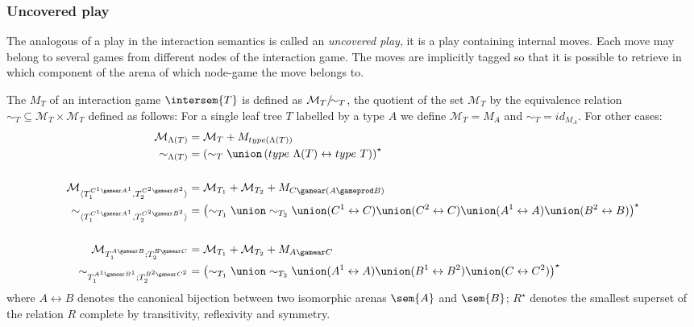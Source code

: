 \subsubsection{Uncovered play}

The analogous of a play in the interaction semantics is called an
\emph{uncovered play}, it is a play containing internal moves. Each move may belong to several games 
from different nodes of the interaction game.
The moves are implicitly tagged so that it is possible to retrieve in
which component of the arena of which node-game the move belongs to.

\begin{definition}
The  $M_T$ of an interaction game
$\intersem{T}$ is defined as $\mathcal{M}_T/\hspace{-0.5em}\sim_T$,
the quotient of the set $\mathcal{M}_T$ by the equivalence relation
$\sim_T \subseteq \mathcal{M}_T \times \mathcal{M}_T$ defined as follows:
For a single leaf tree $T$ labelled by a type $A$ we define
$\mathcal{M}_T = M_A$ and $\sim_T = id_{M_A}$. For other cases:
    \begin{align*}
        \mathcal{M}_{\Lambda(T)} &= \mathcal{M}_{T} + M_{type(\Lambda(T))}
    \\
        \sim_{\Lambda(T)} &= \left( \sim_{T}
        \union \left(type\ \Lambda(T) \leftrightarrow type\ T\right)
        \right)^\star
    \\
    \\
        \mathcal{M}_{\langle T_1^{C^1 \gamear A^1}, T_2^{C^2 \gamear B^2}\rangle}
        &= \mathcal{M}_{T_1} + \mathcal{M}_{T_2} + M_{C \gamear (A \gameprod B)}
    \\
         \sim_{\langle T_1^{C^1 \gamear A^1}, T_2^{C^2 \gamear B^2}\rangle} &= \left( \sim_{T_1}
        \union \sim_{T_2} \union (C^1 \leftrightarrow C) \union (C^2 \leftrightarrow C)
        \union (A^1 \leftrightarrow A) \union (B^2 \leftrightarrow B)
        \right)^\star
    \\
    \\
        \mathcal{M}_{T_1^{A \gamear B};T_2^{B \gamear C}} &=
            \mathcal{M}_{T_1} + \mathcal{M}_{T_2} + M_{A\gamear C}
        \\
         \sim_{T_1^{A^1 \gamear B^1};T_2^{B^2 \gamear C^2}} &= \left( \sim_{T_1}
        \union \sim_{T_2} \union (A^1 \leftrightarrow A)
        \union (B^1 \leftrightarrow B^2) \union (C \leftrightarrow C^2)
        \right)^\star
    \end{align*}
    where $A\leftrightarrow B$ denotes the canonical bijection between two isomorphic arenas $\sem{A}$ and $\sem{B}$; $R^\star$ denotes the smallest superset of the relation $R$ complete by transitivity, reflexivity and symmetry.
\end{definition}

